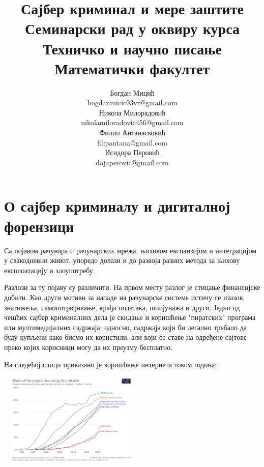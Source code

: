 \documentclass[a4paper]{article}
\begin{document}
	\title{Сајбер криминал и мере заштите\\ \small{Семинарски рад у оквиру курса Техничко и научно писање\\ Математички факултет}}
	
	\author{Богдан Мицић\\ bogdanmicic03vr@gmail.com\\ Никола Милорадовић\\ nikolamiloradovic456@gmail.com\\ Филип Антанасковић\\ filipantana@gmail.com\\ Исидора Перовић\\ dojaperovic@gmail.com} 
	\maketitle
	\tableofcontents
	\newpage
	
	\section{О сајбер криминалу и дигиталној форензици}
         \label{sec:Uvod}
        Са појавом рачунара и рачунарских мрежа, њиховом експанзијом и интеграцијом у свакодневни живот, упоредо долази и до развоја разних метода за њихову експлоатацију и злоупотребу.

        Разлози за ту појаву су различити. На првом месту разлог је стицање финансијске добити. Као други мотиви за нападе на рачунарске системе истичу се 
        изазов, знатижеља, самопотрвђивање, крађа података, шпијунажа и други. Једно од чешћих сајбер криминалних дела је скидање и коришћење "пиратских" програма или мултимедијалних садржаја; односно, садржаја који би легално требало да буду купљени како бисмо их користили, али који се ставе на одређене сајтове преко којих корисници могу да их преузму бесплатно.

        На следећој слици приказано је коришћење интернета током година:\cite{slikaKoriscenjeInterneta}

        \begin{center}
        \includegraphics[width=7cm, height=4.5cm]{koriscenje-interneta-po-godinama.png}
        \end{center}
        
\end{document}
